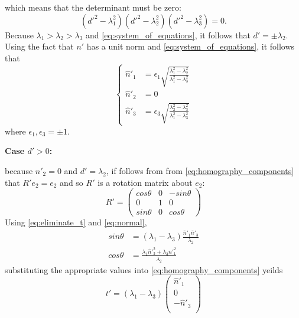 \documentclass{article}
\begin{document}
%
which means that the determinant must be zero:
%
\begin {equation}
(d'^2 - \lambda_1^2) (d'^2 - \lambda_2^2) (d'^2 - \lambda_3^2) = 0.
\end {equation}
%
Because $\lambda_1 > \lambda_2 > \lambda_3$ and \eqref {eq:system_of_equations}, it follows that $d' = \pm \lambda_2$.
%
Using the fact that $n'$ has a unit norm and \eqref {eq:system_of_equations}, it follows that
%
\begin {equation}
\label {eq:normal}
\left \{
\begin {aligned}
\hat{n}'_1 &= \epsilon_1 \sqrt {\frac {\lambda_1^2 - \lambda_2^2}{\lambda_1^2 - \lambda_3^2}} \\
\hat{n}'_2 &= 0 \\
\hat{n}'_3 &= \epsilon_3 \sqrt {\frac {\lambda_2^2 - \lambda_3^2}{\lambda_1^2 - \lambda_3^2}}
\end {aligned}
\right.
\end {equation}
%
where $\epsilon_1, \epsilon_3 = \pm 1$.

\noindent
\textbf {Case $d' > 0$:}

\noindent
because $\hat{n}'_2 = 0$ and $d' = \lambda_2$, if follows from from \eqref {eq:homography_components} that $R' e_2 = e_2$ and so $R'$ is a rotation matrix about $e_2$:
%
\begin {equation}
R' =
\begin {pmatrix}
cos \theta & 0 & -sin \theta \\
0          & 1 &    0        \\
sin \theta & 0 &  cos \theta
\end {pmatrix}
\end {equation}
%
Using \eqref {eq:eliminate_t} and \eqref {eq:normal},
%
\begin {equation}
\begin {aligned}
sin \theta &= (\lambda_1 - \lambda_3) \frac {\hat{n}'_1 \hat{n}'_3} {\lambda_2} \\
cos \theta &= \frac {\lambda_1 \hat{n}'^2_3 + \lambda_3 \hat{n}'^2_1} {\lambda_2}
\end {aligned}
\end {equation}
%
substituting the appropriate values into \eqref {eq:homography_components} yeilds
%
\begin {equation}
t' = (\lambda_1 - \lambda_3)
\begin {pmatrix}
\hat{n}'_1 \\
0 \\
-\hat{n}'_3 \\
\end {pmatrix}
\end {equation}
\end{document}
